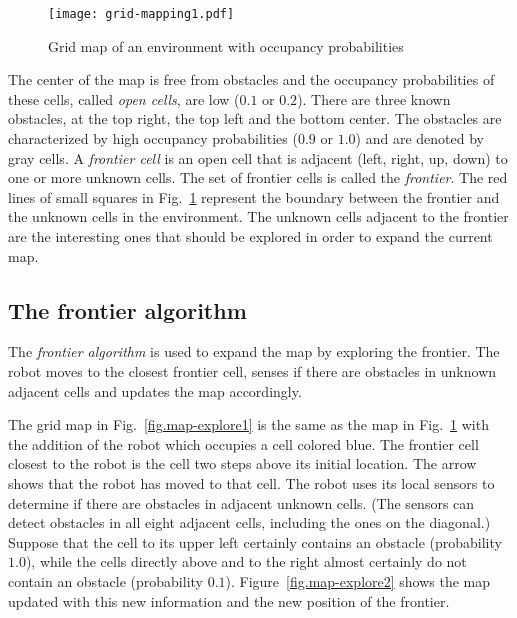 \begin{figure}
\begin{center}
\texttt{[image: grid-mapping1.pdf]}
\end{center}
\caption{Grid map of an environment with occupancy probabilities}\label{fig.map-explore}
\end{figure}

The center of the map is free from obstacles and the occupancy probabilities of these cells, called \emph{open cells}, are low ($0.1$ or $0.2$). There are three known obstacles, at the top right, the top left and the bottom center. The obstacles are characterized by high occupancy probabilities ($0.9$ or $1.0$) and are denoted by gray cells. A \emph{frontier cell} is an open cell that is adjacent (left, right, up, down) to one or more unknown cells. The set of frontier cells is called the \emph{frontier}. The red lines of small squares in Fig.~\ref{fig.map-explore} represent the boundary between the frontier and the unknown cells in the environment. The unknown cells adjacent to the frontier are the interesting ones that should be explored in order to expand the current map.

\subsection{The frontier algorithm}

The \emph{frontier algorithm} is used to expand the map by exploring the frontier. The robot moves to the closest frontier cell, senses if there are obstacles in unknown adjacent cells and updates the map accordingly. 

The grid map in Fig.~\ref{fig.map-explore1} is the same as the map in Fig.~\ref{fig.map-explore} with the addition of the robot which occupies a cell colored blue. The frontier cell closest to the robot is the cell two steps above its initial location. The arrow shows that the robot has moved to that cell. The robot uses its local sensors to determine if there are obstacles in adjacent unknown cells. (The sensors can detect obstacles in all eight adjacent cells, including the ones on the diagonal.) Suppose that the cell to its upper left certainly contains an obstacle (probability $1.0$), while the cells directly above and to the right almost certainly do not contain an obstacle (probability $0.1$). Figure~\ref{fig.map-explore2} shows the map updated with this new information and the new position of the frontier.


